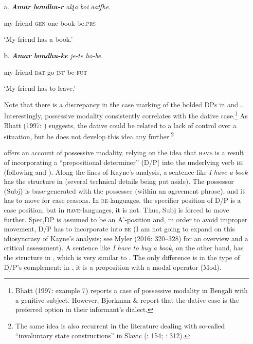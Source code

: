 \documentclass[output=paper,modfonts,nonflat]{langsci/langscibook}
\begin{document}
\ea%
    \label{ex:key:1}
    \gll\\
        \\
    \glt
    \z

          a.  \textbf{\textit{Amar}    \textit{bondhu-r}}     \textit{akʈa}   \textit{boi}     \textit{aatʃhe}.

    my       friend-\textsc{gen}  one     book   be.\textsc{prs}

      ‘My friend has a book.’

  b.    \textbf{\textit{Amar}    \textit{bondhu-ke}}    \textit{je-te}     \textit{ho-be}.

      my      friend-\textsc{dat}    go-\textsc{inf}   be-\textsc{fut}

      ‘My friend has to leave.’

Note that there is a discrepancy in the case marking of the bolded DPs in  and . Interestingly, possessive modality consistently correlates with the dative case.\footnote{Bhatt (1997: example 7) reports a case of possessive modality in Bengali with a genitive subject. However, Bjorkman \& \citet[46]{Cowper2016} report that the dative case is the preferred option in their informant’s dialect.} As Bhatt (1997: ) suggests, the dative could be related to a lack of control over a situation, but he does not develop this idea any further.\footnote{The same idea is also recurrent in the literature dealing with so-called “involuntary state constructions” in Slavic (\citealt{Rivero2009}: 154; \citealt{RiveroArregui2012}: 312).}  

\citet{Bhatt1997} offers an account of possessive modality, relying on the idea that \textsc{have} is a result of incorporating a “prepositional determiner” (D/P) into the underlying verb \textsc{be} (following \citealt{Freeze1992} and \citealt{Kayne1993}). Along the lines of Kayne’s analysis, a sentence like \textit{I} \textit{have} \textit{a} \textit{book} has the structure in  (several technical details being put aside). The possessor (Subj) is base-generated with the possessee (within an agreement phrase), and it has to move for case reasons. In \textsc{be}{}-languages, the specifier position of D/P is a case position, but in \textsc{have-}languages, it is not. Thus, Subj is forced to move further. Spec,DP is assumed to be an A'{}-position and, in order to avoid improper movement, D/P has to incorporate into \textsc{be} (I am not going to expand on this idiosyncrasy of Kayne’s analysis; see Myler (2016: 320–328) for an overview and a critical assessment). A sentence like \textit{I} \textit{have} \textit{to} \textit{buy} \textit{a} \textit{book}, on the other hand, has the structure in , which is very similar to . The only difference is in the type of D/P’s complement: in , it is a proposition with a modal operator (Mod). 
\end{document}
